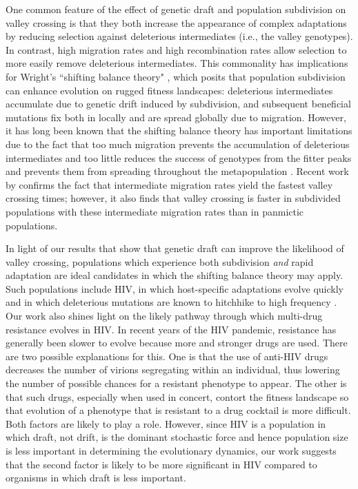 \documentclass[10pt,twocolumn,twoside]{gsajnl}
\begin{document}
\begin{spacing}{1.5}
One common feature of the effect of genetic draft and population subdivision on valley crossing is that they both increase the appearance of complex adaptations by reducing selection against deleterious intermediates (i.e., the valley genotypes).
In contrast, high migration rates and high recombination rates \citep{neher_shraiman_2009} allow selection to more easily remove deleterious intermediates.
This commonality has implications for Wright's ``shifting balance theory" \citep{Wright:1932}, which posits that population subdivision can enhance evolution on rugged fitness landscapes: deleterious intermediates accumulate due to genetic drift induced by subdivision, and subsequent beneficial mutations fix both in locally and are spread globally due to migration.
However, it has long been known that the shifting balance theory has important limitations due to the fact that too much migration prevents the accumulation of deleterious intermediates and too little reduces the success of genotypes from the fitter peaks and prevents them from spreading throughout the metapopulation \citep{coyne_barton_turelli_2000,Van-Cleve:Weissman:2015}.
Recent work by \citet{Bitbol:Schwab:2014} confirms the fact that intermediate migration rates yield the fastest valley crossing times; however, it also finds that valley crossing is faster in subdivided populations with these intermediate migration rates than in panmictic populations.

In light of our results that show that genetic draft can improve the likelihood of valley crossing, populations which experience both subdivision \emph{and} rapid adaptation are ideal candidates in which the shifting balance theory may apply.
Such populations include HIV, in which host-specific adaptations evolve quickly \citep{zhang_1997, wain_2007, dapp_2017, theys_2018} and in which deleterious mutations are known to hitchhike to high frequency \citep{zanini_2013, zanini_2015}.
Our work also shines light on the likely pathway through which multi-drug resistance evolves in HIV.
In recent years of the HIV pandemic, resistance has generally been slower to evolve \citep{feder_2015} because more and stronger drugs are used.
There are two possible explanations for this.
One is that the use of anti-HIV drugs decreases the number of virions segregating within an individual, thus lowering the number of possible chances for a resistant phenotype to appear.
The other is that such drugs, especially when used in concert, contort the fitness landscape so that evolution of a phenotype that is resistant to a drug cocktail is more difficult.
Both factors are likely to play a role.
However, since HIV is a population in which draft, not drift, is the dominant stochastic force and hence population size is less important in determining the evolutionary dynamics, our work suggests that the second factor is likely to be more significant in HIV compared to organisms in which draft is less important.


\end{spacing}
\end{document}
